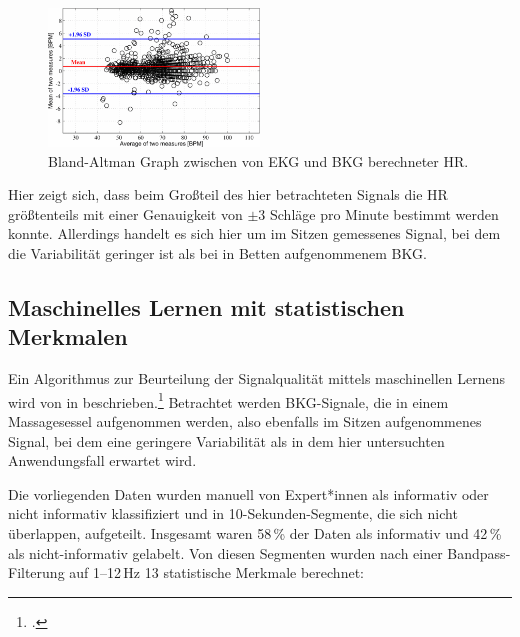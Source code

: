 	\begin{figure}[H]
		\centering
		\includegraphics[width=0.5\textwidth]{pic/bland-altman-pino.png}
		\caption[Genauigkeit der Herzratenberechnung bei schwellwertbasierter Artefakterkennung]{Bland-Altman Graph zwischen von \ac{EKG} und \ac{BKG} berechneter \ac{HR}.\protect\footnotemark}
		\label{fig:bland-altman-pino}
	\end{figure}
	
	Hier zeigt sich, dass beim Großteil des hier betrachteten Signals die \ac{HR} größtenteils mit einer Genauigkeit von $\pm 3$ Schläge pro Minute bestimmt werden konnte. Allerdings handelt es sich hier um im Sitzen gemessenes Signal, bei dem die Variabilität geringer ist als bei in Betten aufgenommenem \ac{BKG}.
	
	
	\subsection{Maschinelles Lernen mit statistischen Merkmalen}\label{ml-beschreibung}	
	
	Ein Algorithmus zur Beurteilung der Signalqualität mittels maschinellen Lernens wird von \citeauthor{Sadek2016} in  beschrieben.\footcite{Sadek2016} Betrachtet werden \ac{BKG}-Signale, die in einem Massagesessel aufgenommen werden, also ebenfalls im Sitzen aufgenommenes Signal, bei dem eine geringere Variabilität als in dem hier untersuchten Anwendungsfall erwartet wird.
	
	Die vorliegenden Daten wurden manuell von Expert*innen als informativ oder nicht informativ klassifiziert und in 10-Sekunden-Segmente, die sich nicht überlappen, aufgeteilt. Insgesamt waren 58\,\% der Daten als informativ und 42\,\% als nicht-informativ gelabelt. Von diesen Segmenten wurden nach einer Bandpass-Filterung auf \numrange{1}{12}\,Hz 13 statistische Merkmale berechnet:

